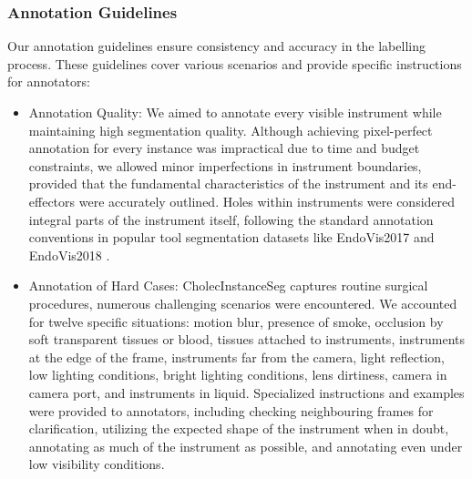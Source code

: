 \subsubsection{Annotation Guidelines}
Our annotation guidelines ensure consistency and accuracy in the labelling process. These guidelines cover various scenarios and provide specific instructions for annotators:
%
%
%
\begin{itemize}
    \item Annotation Quality: We aimed to annotate every visible instrument while maintaining high segmentation quality. Although achieving pixel-perfect annotation for every instance was impractical due to time and budget constraints, we allowed minor imperfections in instrument boundaries, provided that the fundamental characteristics of the instrument and its end-effectors were accurately outlined. Holes within instruments were considered integral parts of the instrument itself, following the standard annotation conventions in popular tool segmentation datasets like EndoVis2017 \cite{endovis2017} and EndoVis2018 \cite{endovis2018}.
    \item Annotation of Hard Cases:  CholecInstanceSeg captures routine surgical procedures, numerous challenging scenarios were encountered. We accounted for twelve specific situations: motion blur, presence of smoke, occlusion by soft transparent tissues or blood, tissues attached to instruments, instruments at the edge of the frame, instruments far from the camera, light reflection, low lighting conditions, bright lighting conditions, lens dirtiness, camera in camera port, and instruments in liquid.
    Specialized instructions and examples were provided to annotators, including checking neighbouring frames for clarification, utilizing the expected shape of the instrument when in doubt, annotating as much of the instrument as possible, and annotating even under low visibility conditions. 
\end{itemize}




